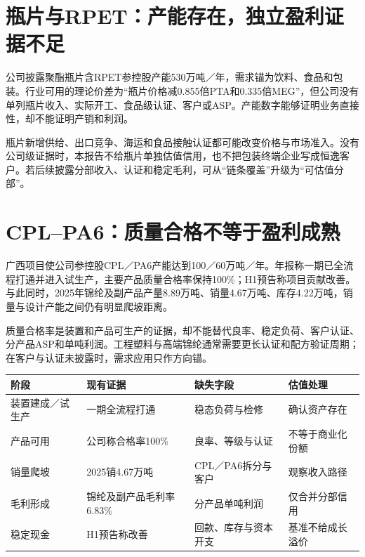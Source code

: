 \section{瓶片与RPET：产能存在，独立盈利证据不足}

公司披露聚酯瓶片含RPET参控股产能530万吨／年，需求锚为饮料、食品和包装。行业可用的理论价差为“瓶片价格减0.855倍PTA和0.335倍MEG”，但公司没有单列瓶片收入、实际开工、食品级认证、客户或ASP。产能数字能够证明业务直接性，却不能证明产销和利润。

瓶片新增供给、出口竞争、海运和食品接触认证都可能改变价格与市场准入。没有公司级证据时，本报告不给瓶片单独估值信用，也不把包装终端企业写成恒逸客户。若后续披露分部收入、认证和稳定毛利，可从“链条覆盖”升级为“可估值分部”。

\section{CPL--PA6：质量合格不等于盈利成熟}

广西项目使公司参控股CPL／PA6产能达到100／60万吨／年。年报称一期已全流程打通并进入试生产，主要产品质量合格率保持100\%；H1预告称项目贡献改善。与此同时，2025年锦纶及副产品产量8.89万吨、销量4.67万吨、库存4.22万吨，销量与设计产能之间仍有明显爬坡距离。

质量合格率是装置和产品可生产的证据，却不能替代良率、稳定负荷、客户认证、分产品ASP和单吨利润。工程塑料与高端锦纶通常需要更长认证和配方验证周期；在客户与认证未披露时，需求应用只作方向锚。

\begin{exhibitbox}
\noindent\begin{tabularx}{\textwidth}{L{2.5cm}L{2.4cm}L{2.65cm}X}
\toprule
\textbf{阶段} & \textbf{现有证据} & \textbf{缺失字段} & \textbf{估值处理} \\
\midrule
装置建成／试生产 & 一期全流程打通 & 稳态负荷与检修 & 确认资产存在 \\
产品可用 & 公司称合格率100\% & 良率、等级与认证 & 不等于商业化份额 \\
销量爬坡 & 2025销4.67万吨 & CPL／PA6拆分与客户 & 观察收入路径 \\
毛利形成 & 锦纶及副产品毛利率6.83\% & 分产品单吨利润 & 仅合并分部信用 \\
稳定现金 & H1预告称改善 & 回款、库存与资本开支 & 基准不给成长溢价 \\
\bottomrule
\end{tabularx}
\end{exhibitbox}

